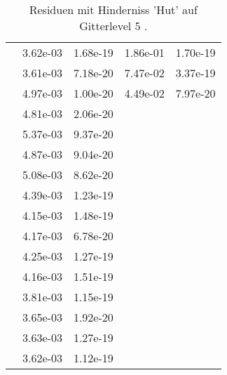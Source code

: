 \begin{table}
\begin{tabular}{c|cc|cc|}
\multicolumn{1}{|c|}{} & \multicolumn{1}{|c|}{  3.62e-03} & \multicolumn{1}{|c|}{  1.68e-19} & \multicolumn{1}{|c|}{  1.86e-01} & \multicolumn{1}{|c|}{  1.70e-19} \\ 
\multicolumn{1}{|c|}{} & \multicolumn{1}{|c|}{  3.61e-03} & \multicolumn{1}{|c|}{  7.18e-20} & \multicolumn{1}{|c|}{  7.47e-02} & \multicolumn{1}{|c|}{  3.37e-19} \\ 
\multicolumn{1}{|c|}{} & \multicolumn{1}{|c|}{  4.97e-03} & \multicolumn{1}{|c|}{  1.00e-20} & \multicolumn{1}{|c|}{  4.49e-02} & \multicolumn{1}{|c|}{  7.97e-20} \\ 
\multicolumn{1}{|c|}{} & \multicolumn{1}{|c|}{  4.81e-03} & \multicolumn{1}{|c|}{  2.06e-20} & \multicolumn{1}{|c|}{} & \multicolumn{1}{|c|}{} \\ 
\multicolumn{1}{|c|}{} & \multicolumn{1}{|c|}{  5.37e-03} & \multicolumn{1}{|c|}{  9.37e-20} & \multicolumn{1}{|c|}{} & \multicolumn{1}{|c|}{} \\ 
\multicolumn{1}{|c|}{} & \multicolumn{1}{|c|}{  4.87e-03} & \multicolumn{1}{|c|}{  9.04e-20} & \multicolumn{1}{|c|}{} & \multicolumn{1}{|c|}{} \\ 
\multicolumn{1}{|c|}{} & \multicolumn{1}{|c|}{  5.08e-03} & \multicolumn{1}{|c|}{  8.62e-20} & \multicolumn{1}{|c|}{} & \multicolumn{1}{|c|}{} \\ 
\multicolumn{1}{|c|}{} & \multicolumn{1}{|c|}{  4.39e-03} & \multicolumn{1}{|c|}{  1.23e-19} & \multicolumn{1}{|c|}{} & \multicolumn{1}{|c|}{} \\ 
\multicolumn{1}{|c|}{} & \multicolumn{1}{|c|}{  4.15e-03} & \multicolumn{1}{|c|}{  1.48e-19} & \multicolumn{1}{|c|}{} & \multicolumn{1}{|c|}{} \\ 
\multicolumn{1}{|c|}{} & \multicolumn{1}{|c|}{  4.17e-03} & \multicolumn{1}{|c|}{  6.78e-20} & \multicolumn{1}{|c|}{} & \multicolumn{1}{|c|}{} \\ 
\multicolumn{1}{|c|}{} & \multicolumn{1}{|c|}{  4.25e-03} & \multicolumn{1}{|c|}{  1.27e-19} & \multicolumn{1}{|c|}{} & \multicolumn{1}{|c|}{} \\ 
\multicolumn{1}{|c|}{} & \multicolumn{1}{|c|}{  4.16e-03} & \multicolumn{1}{|c|}{  1.51e-19} & \multicolumn{1}{|c|}{} & \multicolumn{1}{|c|}{} \\ 
\multicolumn{1}{|c|}{} & \multicolumn{1}{|c|}{  3.81e-03} & \multicolumn{1}{|c|}{  1.15e-19} & \multicolumn{1}{|c|}{} & \multicolumn{1}{|c|}{} \\ 
\multicolumn{1}{|c|}{} & \multicolumn{1}{|c|}{  3.65e-03} & \multicolumn{1}{|c|}{  1.92e-20} & \multicolumn{1}{|c|}{} & \multicolumn{1}{|c|}{} \\ 
\multicolumn{1}{|c|}{} & \multicolumn{1}{|c|}{  3.63e-03} & \multicolumn{1}{|c|}{  1.27e-19} & \multicolumn{1}{|c|}{} & \multicolumn{1}{|c|}{} \\ 
\multicolumn{1}{|c|}{} & \multicolumn{1}{|c|}{  3.62e-03} & \multicolumn{1}{|c|}{  1.12e-19} & \multicolumn{1}{|c|}{} & \multicolumn{1}{|c|}{} \\ 
\hline 
\end{tabular}\caption{Residuen mit Hinderniss 'Hut' auf Gitterlevel 5 .}\label{tab:Residuum_Hut_level5}
\end{table} 
